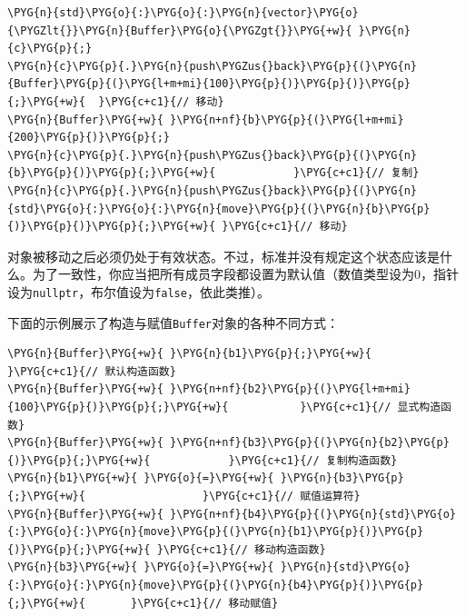 
\begin{codeblockbg}
\begin{Verbatim}[commandchars=\\\{\},breaklines=true,breakanywhere=true,fontsize=\codefont,xleftmargin=17bp]
\PYG{n}{std}\PYG{o}{:}\PYG{o}{:}\PYG{n}{vector}\PYG{o}{\PYGZlt{}}\PYG{n}{Buffer}\PYG{o}{\PYGZgt{}}\PYG{+w}{ }\PYG{n}{c}\PYG{p}{;}
\PYG{n}{c}\PYG{p}{.}\PYG{n}{push\PYGZus{}back}\PYG{p}{(}\PYG{n}{Buffer}\PYG{p}{(}\PYG{l+m+mi}{100}\PYG{p}{)}\PYG{p}{)}\PYG{p}{;}\PYG{+w}{  }\PYG{c+c1}{// 移动}
\PYG{n}{Buffer}\PYG{+w}{ }\PYG{n+nf}{b}\PYG{p}{(}\PYG{l+m+mi}{200}\PYG{p}{)}\PYG{p}{;}
\PYG{n}{c}\PYG{p}{.}\PYG{n}{push\PYGZus{}back}\PYG{p}{(}\PYG{n}{b}\PYG{p}{)}\PYG{p}{;}\PYG{+w}{            }\PYG{c+c1}{// 复制}
\PYG{n}{c}\PYG{p}{.}\PYG{n}{push\PYGZus{}back}\PYG{p}{(}\PYG{n}{std}\PYG{o}{:}\PYG{o}{:}\PYG{n}{move}\PYG{p}{(}\PYG{n}{b}\PYG{p}{)}\PYG{p}{)}\PYG{p}{;}\PYG{+w}{ }\PYG{c+c1}{// 移动}
\end{Verbatim}
\end{codeblockbg}



对象被移动之后必须仍处于有效状态。不过，标准并没有规定这个状态应该是什么。为了一致性，你应当把所有成员字段都设置为默认值（数值类型设为0，指针设为\texttt{nullptr}，布尔值设为\texttt{false}，依此类推）。



下面的示例展示了构造与赋值\texttt{Buffer}对象的各种不同方式：



\begin{codeblockbg}
\begin{Verbatim}[commandchars=\\\{\},breaklines=true,breakanywhere=true,fontsize=\codefont,xleftmargin=17bp]
\PYG{n}{Buffer}\PYG{+w}{ }\PYG{n}{b1}\PYG{p}{;}\PYG{+w}{                }\PYG{c+c1}{// 默认构造函数}
\PYG{n}{Buffer}\PYG{+w}{ }\PYG{n+nf}{b2}\PYG{p}{(}\PYG{l+m+mi}{100}\PYG{p}{)}\PYG{p}{;}\PYG{+w}{           }\PYG{c+c1}{// 显式构造函数}
\PYG{n}{Buffer}\PYG{+w}{ }\PYG{n+nf}{b3}\PYG{p}{(}\PYG{n}{b2}\PYG{p}{)}\PYG{p}{;}\PYG{+w}{            }\PYG{c+c1}{// 复制构造函数}
\PYG{n}{b1}\PYG{+w}{ }\PYG{o}{=}\PYG{+w}{ }\PYG{n}{b3}\PYG{p}{;}\PYG{+w}{                  }\PYG{c+c1}{// 赋值运算符}
\PYG{n}{Buffer}\PYG{+w}{ }\PYG{n+nf}{b4}\PYG{p}{(}\PYG{n}{std}\PYG{o}{:}\PYG{o}{:}\PYG{n}{move}\PYG{p}{(}\PYG{n}{b1}\PYG{p}{)}\PYG{p}{)}\PYG{p}{;}\PYG{+w}{ }\PYG{c+c1}{// 移动构造函数}
\PYG{n}{b3}\PYG{+w}{ }\PYG{o}{=}\PYG{+w}{ }\PYG{n}{std}\PYG{o}{:}\PYG{o}{:}\PYG{n}{move}\PYG{p}{(}\PYG{n}{b4}\PYG{p}{)}\PYG{p}{;}\PYG{+w}{       }\PYG{c+c1}{// 移动赋值}
\end{Verbatim}
\end{codeblockbg}


